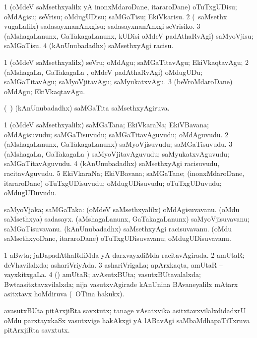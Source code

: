 \bentry
{}
\gl{\sakirx}
\bmng
\bnum
\num{1} (oMdeV saMsethxyalilx yA inonxMdaroDane, itararoDane) oTuTxgUDisu; oMdAgisu; seVrisu; oMdugUDisu; saMGaTisu; EkiVkarisu. 
\num{2} (\kanmu\ saMsethx \mo vugaLalilx) sadasayxnanAnxgisu; sadasayxnanAnxgi seVrisiko. 
\num{3} (aMshagaLanunx, GaTakagaLanunx, kUDisi oMdeV padAthaRvAgi) saMyoVjisu; saMGaTisu. 
\num{4} (kAnUnubadadhx) saMsethxyAgi racisu. 
\enum
\emng

\noindent
\gl{\akirx}
\bmng
\bnum
\num{1} (oMdeV saMsethxyalilx) seVru; oMdAgu; saMGaTitavAgu; EkiVkaqtavAgu; 
\num{2} (aMshagaLa, GaTakagaLa \vi, oMdeV padAthaRvAgi) oMdugUDu; saMGaTitavAgu; saMyoVjitavAgu; saMyukatxvAgu. 
\num{3} (beVroMdaroDane) oMdAgu; EkiVkaqtavAgu. 
\enum
\emng
\eentry

\bentry
{}
\gl{\gu}
\bmng
(\kanmu\ \ame) (kAnUnubadadhx) saMGaTita saMsethxyAgiruva. 
\emng
\eentry

\bentry
{}
\gl{\nA}
\bmng
\bnum
\num{1} (oMdeV saMsethxyalilx) saMGaTana; EkiVkaraNa; EkiVBavana; oMdAgisuvudu; saMGaTisuvudu; saMGaTitavAguvudu; oMdAguvudu. 
\num{2} (aMshagaLanunx, GaTakagaLanunx) saMyoVjisuvudu; saMGaTisuvudu. 
\num{3} (aMshagaLa, GaTakagaLa \vi) saMyoVjitavAguvudu; saMyukatxvAguvudu; saMGaTitavAguvudu. 
\num{4} (kAnUnubadadhx) saMsethxyAgi racisuvudu, racitavAguvudu. 
\num{5} EkiVkaraNa; EkiVBavana; saMGaTane; (inonxMdaroDane, itararoDane) oTuTxgUDisuvudu; oMdugUDisuvudu; oTuTxgUDuvudu; oMdugUDuvudu. 
\enum
\emng
\eentry

\bentry
{}
\gl{\nA}
\bmng
saMyoVjaka; saMGaTaka: 
\banum
{} (oMdeV saMsethxyalilx) oMdAgisuvavanu. 
 (oMdu saMsethxya) sadasayx. 
 (aMshagaLanunx, GaTakagaLanunx) saMyoVjisuvavanu; saMGaTisuvavanu. 
 (kAnUnubadadhx) saMsethxyAgi racisuvavanu. 
 (oMdu saMsethxyoDane, itararoDane) oTuTxgUDisuvavanu; oMdugUDisuvavanu. 
\eanum
\emng
\eentry

\bentry
{}
\gl{\gu}
\bmng
\bnum
\num{1} aBwta; jaDapadAthaRdiMda yA darxvayxdiMda racitavAgirada. 
\num{2} amUtaR; deVhavilalxda; ashariVriyAda. 
\num{3} ashariVrigaLa; apArxkaqta, amUtaR -- vayxkitxgaLa. 
\num{4} (\nAyxshA) amUtaR; avAsutxBUta; vasutxBUtavalalxda; Bwtaasitxtavxvilalxda; nija vasutxvAgirade kAnUnina BAvaneyalilx mAtarx asitxtavx hoMdiruva (\udA\ OTina hakukx). 
\enum
\emng

\noindent
\gl{\pagu}
\bmng
{} avasutxBUta pitArxjiRta savxtutx; tanage vAsatxvika asitxtavxvilalxdidadxrU oMdu parxtayxkaSx vasutxvige hakAkxgi yA lABavAgi saMbaMdhapaTiTxruva pitArxjiRta savxtutx. 
\emng
\eentry

